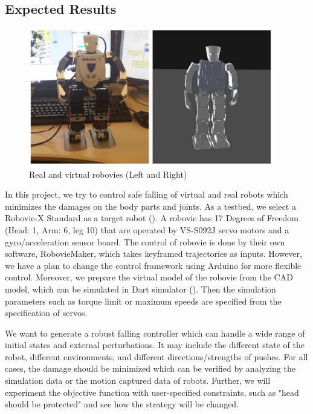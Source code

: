 \subsection{Expected Results}

\begin{figure}[htbp]
\center
  \includegraphics[width=4.2in]{images/falling2_robovies}
  \caption{Real and virtual robovies (Left and Right)} 
 \label{fig:robovies}
\end{figure}

In this project, we try to control safe falling of virtual and real robots
which minimizes the damages on the body parts and joints.
As a testbed, we select a Robovie-X Standard \cite{Robovie} as a target robot
().
A robovie has 17 Degrees of Freedom (Head: 1, Arm: 6, leg 10) 
that are operated by VS-S092J servo motors and a gyro/acceleration sensor board.
The control of robovie is done by their own software, RobovieMaker, 
which takes keyframed trajectories as inputs.
However, we have a plan to change the control framework using Arduino 
for more flexible control.
Moreover, we prepare the virtual model of the robovie from the CAD model,
which can be simulated in Dart simulator \cite{Dart} ().
Then the simulation parameters such as torque limit or maximum speeds are 
specified from the specification of servos.

We want to generate a robust falling controller which can handle
a wide range of initial states and external perturbations.
It may include the different state of the robot, different environments, 
and different directions/strengths of pushes.
For all cases, the damage should be minimized which can be verified by 
analyzing the simulation data or the motion captured data of robots.
Further, we will experiment the objective function with user-specified constraints, 
such as "head should be protected" and see how the strategy will be changed.




